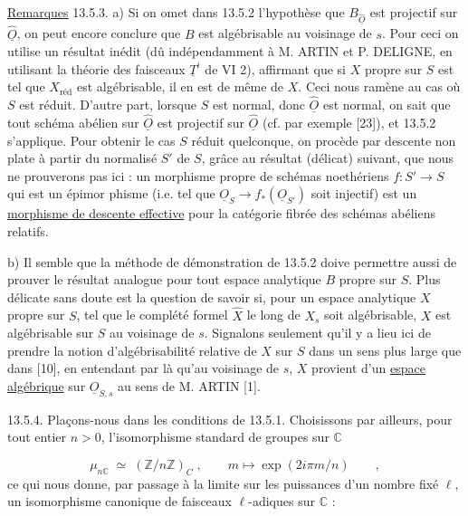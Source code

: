 \underline{Remarques} 13.5.3. a) Si on omet dans 13.5.2 l'hypothèse que $B_{\hat{\underline{O}}}$ est projectif sur $\hat{\underline{O}}$, on peut encore conclure que $B$ est algébrisable au voisinage de $s$. Pour ceci on utilise un résultat inédit (dû indépendamment à M. ARTIN et P. DELIGNE, en utilisant la théorie des faisceaux $\underline{T}^i$ de VI 2), affirmant que si $X$ propre sur $S$ est tel que $X_{\text{réd}}$ est algébrisable, il en est de même de $X$. Ceci nous ramène au cas où $S$ est réduit. D'autre part, lorsque $S$ est normal, donc $\hat{\underline{O}}$ est normal, on sait que tout schéma abélien sur $\hat{\underline{O}}$ est projectif sur $\hat{\underline{O}}$ (cf. par exemple [23]), et 13.5.2 s'applique. Pour obtenir le cas $S$ réduit quelconque, on procède par descente non plate à partir du normalisé $S'$ de $S$, grâce au résultat (délicat) suivant, que nous ne prouverons pas ici : un morphisme propre de schémas noethériens $f : S' \longrightarrow S$ qui est un épimor%
phisme (i.e. tel que $\underline{O}_S \longrightarrow f_*(\underline{O}_{S'})$ soit injectif) est un \underline{morphisme de descente effective} pour la catégorie fibrée des schémas abéliens relatifs.

b) Il semble que la méthode de démonstration de 13.5.2 doive permettre aussi de prouver le résultat analogue pour tout espace analytique $B$ propre sur $S$. Plus délicate sans doute est la question de savoir si, pour un espace analytique $X$ propre sur $S$, tel que le complété formel $\hat{X}$ le long de $X_s$ soit algébrisable, $X$ est algébrisable sur $S$ au voisinage de $s$. Signalons seulement qu'il y a lieu ici de prendre la notion d'algébrisabilité relative de $X$ sur $S$ dans un sens plus large que dans [10], en entendant par là qu'au voisinage de $s$, $X$ provient d'un \underline{espace algébrique} sur $\underline{O}_{S,s}$ au sens de M. ARTIN [1].

13.5.4. Plaçons-nous dans les conditions de 13.5.1. Choisissons par ailleurs, pour tout entier $n > 0$, l'isomorphisme standard de groupes sur $\mathbb{C}$

\begin{equation*}
\mu_{n\mathbb{C}} \;\simeq\; (\mathbb{Z}/n\mathbb{Z})_{C} \;,\qquad m \longmapsto \exp(2i\pi m/n) \qquad ,
\end{equation*}
ce qui nous donne, par passage à la limite sur les puissances d'un nombre fixé $\ell$, un isomorphisme canonique de faisceaux $\ell$-adiques sur $\mathbb{C}$ :

